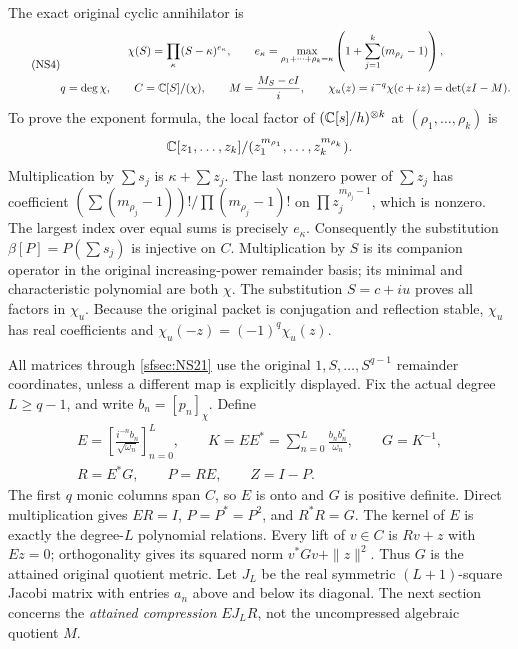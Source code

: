 The exact original cyclic annihilator is
\begin{equation}\tag{NS4}\label{sfsec:NS4}
\begin{gathered}
\chi(S)=\prod_\kappa(S-\kappa)^{e_\kappa},\qquad
e_\kappa=\max_{\rho_1+\cdots+\rho_k=\kappa}
 \left(1+\sum_{j=1}^k(m_{\rho_j}-1)\right),\\
q=\deg\chi,\qquad C=\mathbb C[S]/(\chi),\qquad
M=\frac{M_S-cI}{i},\qquad
\chi_u(z)=i^{-q}\chi(c+iz)=\det(zI-M).
\end{gathered}
\end{equation}
To prove the exponent formula, the local factor of
$(\mathbb C[s]/h)^{\otimes k}$ at $(\rho_1,\ldots,\rho_k)$ is
\[
\mathbb C[z_1,\ldots,z_k]/
       (z_1^{m_{\rho_1}},\ldots,z_k^{m_{\rho_k}}).
\]
Multiplication by $\sum s_j$ is $\kappa+\sum z_j$.
The last nonzero power of $\sum z_j$ has coefficient
$(\sum(m_{\rho_j}-1))!/\prod(m_{\rho_j}-1)!$ on
$\prod z_j^{m_{\rho_j}-1}$, which is nonzero.
The largest index over equal sums is precisely $e_\kappa$.
Consequently the substitution $\beta[P]=P(\sum s_j)$ is
injective on $C$. Multiplication by $S$ is its companion
operator in the original increasing-power remainder basis;
its minimal and characteristic polynomial are both $\chi$.
The substitution $S=c+iu$ proves all factors in $\chi_u$.
Because the original packet is conjugation and reflection
stable, $\chi_u$ has real coefficients and
$\chi_u(-z)=(-1)^q\chi_u(z)$.

All matrices through \eqref{sfsec:NS21} use the original
$1,S,\ldots,S^{q-1}$ remainder coordinates, unless a different
map is explicitly displayed. Fix the actual degree $L\geq q-1$,
and write $b_n=[p_n]_\chi$. Define
\begin{equation}\tag{NS5}\label{sfsec:NS5}
\begin{gathered}
E=\left[\frac{i^{-n}b_n}{\sqrt{\omega_n}}\right]_{n=0}^L,
\qquad K=EE^*=\sum_{n=0}^L\frac{b_nb_n^*}{\omega_n},
\qquad G=K^{-1},\\
R=E^*G,\qquad P=RE,\qquad Z=I-P.
\end{gathered}
\end{equation}
The first $q$ monic columns span $C$, so $E$ is onto and $G$
is positive definite. Direct multiplication gives $ER=I$,
$P=P^*=P^2$, and $R^*R=G$.
The kernel of $E$ is exactly the degree-$L$ polynomial
relations. Every lift of $v\in C$ is $Rv+z$ with $Ez=0$;
orthogonality gives its squared norm $v^*Gv+\|z\|^2$.
Thus $G$ is the attained original quotient metric.
Let $J_L$ be the real symmetric $(L+1)$-square Jacobi matrix
with entries $a_n$ above and below its diagonal. The next
section concerns the \emph{attained compression}
$EJ_LR$, not the uncompressed algebraic quotient $M$.


